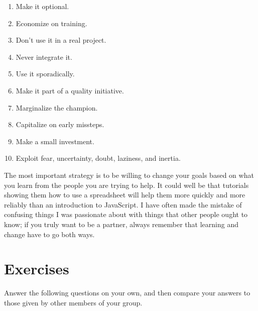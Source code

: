 \begin{enumerate}

\item
  Make it optional.

\item
  Economize on training.

\item
  Don't use it in a real project.

\item
  Never integrate it.

\item
  Use it sporadically.

\item
  Make it part of a quality initiative.

\item
  Marginalize the champion.

\item
  Capitalize on early missteps.

\item
  Make a small investment.

\item
  Exploit fear, uncertainty, doubt, laziness, and inertia.

\end{enumerate}

The most important strategy is to be willing to change your goals
based on what you learn from the people you are trying to help.  It
could well be that tutorials showing them how to use a spreadsheet
will help them more quickly and more reliably than an introduction to
JavaScript.  I have often made the mistake of confusing things I was
passionate about with things that other people ought to know; if you
truly want to be a partner, always remember that learning and change
have to go both ways.

\section{Exercises}\label{s:partner-exercises}


Answer the following questions on your own, and then compare your
answers to those given by other members of your group.

